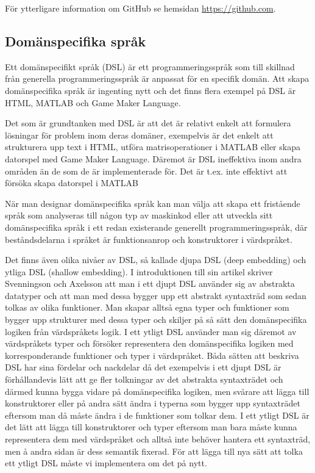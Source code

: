 \documentclass[]{article}
\begin{document}
För ytterligare information om GitHub se hemsidan \url{https://github.com}.


\subsection{Domänspecifika språk}
Ett domänspecifikt språk (\gls{DSL}) är ett programmeringsspråk som till
skillnad från generella programmeringsspråk är anpassat för en
specifik domän. Att skapa domänspecifika språk är ingenting nytt och det
finns flera exempel på DSL är HTML, MATLAB och Game Maker Language.

Det som är grundtanken med DSL är att det är relativt enkelt att formulera lösningar
för problem inom deras domäner, exempelvis är det enkelt att strukturera upp text i
HTML, utföra matrisoperationer i MATLAB eller skapa datorspel med Game Maker Language.
Däremot är DSL ineffektiva inom andra områden än de som de är implementerade för.
Det är t.ex. inte effektivt att försöka skapa datorspel i MATLAB

När man designar domänspecifika språk kan man välja att skapa ett fristående
språk som analyseras till någon typ av maskinkod eller att utveckla sitt
domänspecifika språk i ett redan existerande generellt programmeringsspråk,
där beståndsdelarna i språket är funktionsanrop och konstruktorer i värdspråket.

Det finns även olika nivåer av DSL, så kallade djupa DSL (deep embedding) och
ytliga DSL (shallow embedding). I introduktionen till sin artikel skriver
Svenningson och Axelsson \cite{Svenningsson2013} att man i ett djupt
DSL använder sig av abstrakta datatyper och att man med dessa bygger upp ett
abstrakt syntaxträd som sedan tolkas av olika funktioner.
Man skapar alltså egna typer och funktioner som bygger upp strukturer med dessa
typer och skiljer på så sätt den domänspecifika logiken från värdspråkets logik.
I ett ytligt DSL använder man sig däremot av värdspråkets typer och försöker
representera den domänspecifika logiken med korresponderande funktioner och
typer i värdspråket.
Båda sätten att beskriva DSL har sina fördelar och nackdelar då det exempelvis
i ett djupt DSL är förhållandevis lätt att ge fler tolkningar av det abstrakta
syntaxträdet och därmed kunna bygga vidare på domänspecifika logiken,
men svårare att lägga till konstruktorer eller på andra sätt ändra i typerna som
bygger upp syntaxträdet eftersom man då måste ändra i de funktioner som tolkar
dem. I ett ytligt DSL är det lätt att lägga till konstruktorer och typer
eftersom man bara måste kunna representera dem med värdspråket och alltså inte
behöver hantera ett syntaxträd, men å andra sidan är dess semantik fixerad.
För att lägga till nya sätt att tolka ett ytligt DSL måste vi implementera
om det på nytt.
\end{document}
